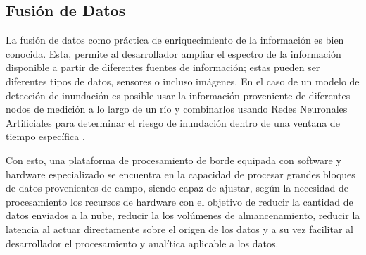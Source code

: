 \subsection{Fusión de Datos}

La fusión de datos como práctica de enriquecimiento de la información es bien conocida. Esta, permite al desarrollador ampliar el espectro de la información disponible a partir de diferentes fuentes de información; estas pueden ser diferentes tipos de datos, sensores o incluso imágenes. En el caso de un modelo de detección de inundación es posible usar la información proveniente de diferentes nodos de medición a lo largo de un río y combinarlos usando Redes Neuronales Artificiales para determinar el riesgo de inundación dentro de una ventana de tiempo específica \cite{ANN1,ANN2,ANN3}.

Con esto, una plataforma de procesamiento de borde equipada con software y hardware especializado \iffalse como el propuesto en este proyecto \fi se encuentra en la capacidad de procesar grandes bloques de datos provenientes de campo, siendo capaz de ajustar, según la necesidad de procesamiento los recursos de hardware con el objetivo de reducir la cantidad de datos enviados a la nube, reducir la los volúmenes de almancenamiento, reducir la latencia al actuar directamente sobre el origen de los datos y a su vez facilitar al desarrollador el procesamiento y analítica aplicable a los datos.